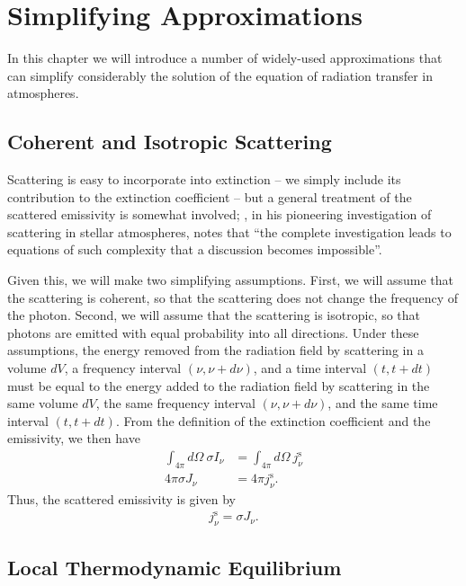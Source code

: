 
\chapter{Simplifying Approximations}

\noindent
In this chapter we will introduce a number of widely-used approximations that can simplify considerably the solution of the equation of radiation transfer in atmospheres.

\section{Coherent and Isotropic Scattering}

Scattering is easy to incorporate into extinction -- we simply include
its contribution to the extinction coefficient -- but a general
treatment of the scattered emissivity is somewhat
involved; \citet[p.\ 5]{Schuster-1905}, in his pioneering
investigation of scattering in stellar atmospheres, notes that ``the
complete investigation leads to equations of such complexity that a
discussion becomes impossible''.

Given this, we  will make two
simplifying assumptions. First, we will assume that the scattering is
coherent, so that the scattering does not change the frequency of the
photon. Second, we will assume that the scattering is isotropic, so that
photons are emitted with equal probability into all directions. Under
these assumptions, the energy removed from the radiation field by
scattering in a volume $dV$, a frequency interval $(\nu,\nu+d\nu)$, and
a time interval $(t,t+dt)$ must be equal to the energy added to the
radiation field by scattering in the same volume $dV$, the same
frequency interval $(\nu,\nu+d\nu)$, and the same time interval
$(t,t+dt)$. From the definition of the extinction coefficient and the
emissivity, we then have
\begin{align}
\int_{4\pi}\!\!\!d\Omega\:
\sigma I_\nu
&=
\int_{4\pi}\!\!\!d\Omega\:
j_\nu^\mathrm{s}\\
4\pi\sigma J_\nu
&=
4\pi j_\nu^\mathrm{s}.
\end{align}
Thus, the scattered emissivity is given by
\begin{align}
j_\nu^\mathrm{s} = \sigma J_\nu.
\end{align}

\section{Local Thermodynamic Equilibrium}

